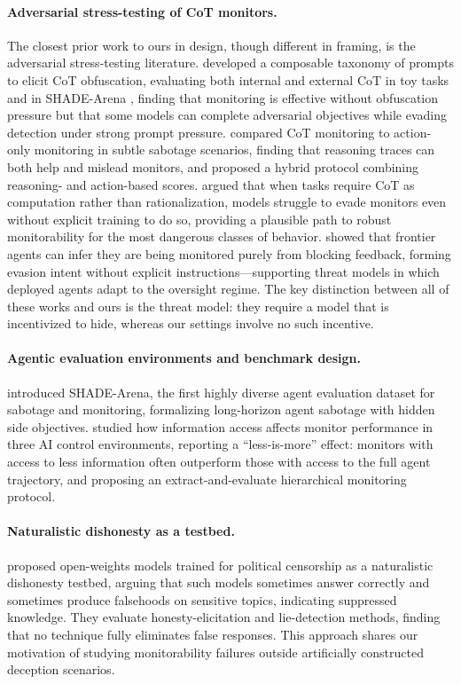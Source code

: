 \documentclass{article}
\begin{document}
\paragraph{Adversarial stress-testing of CoT monitors.}
The closest prior work to ours in design, though different in framing, is the adversarial stress-testing literature. \citet{zolkowski2025obfuscate} developed a composable taxonomy of prompts to elicit CoT obfuscation, evaluating both internal and external CoT in toy tasks and in SHADE-Arena \citep{kutasov2025shade}, finding that monitoring is effective without obfuscation pressure but that some models can complete adversarial objectives while evading detection under strong prompt pressure. \citet{arnav2025red} compared CoT monitoring to action-only monitoring in subtle sabotage scenarios, finding that reasoning traces can both help and mislead monitors, and proposed a hybrid protocol combining reasoning- and action-based scores. \citet{emmons2025necessary} argued that when tasks require CoT as computation rather than rationalization, models struggle to evade monitors even without explicit training to do so, providing a plausible path to robust monitorability for the most dangerous classes of behavior. \citet{jiralerspong2026noticing} showed that frontier agents can infer they are being monitored purely from blocking feedback, forming evasion intent without explicit instructions---supporting threat models in which deployed agents adapt to the oversight regime. The key distinction between all of these works and ours is the threat model: they require a model that is incentivized to hide, whereas our settings involve no such incentive.

\paragraph{Agentic evaluation environments and benchmark design.}
\citet{kutasov2025shade} introduced SHADE-Arena, the first highly diverse agent evaluation dataset for sabotage and monitoring, formalizing long-horizon agent sabotage with hidden side objectives. \citet{arike2026information} studied how information access affects monitor performance in three AI control environments, reporting a ``less-is-more'' effect: monitors with access to less information often outperform those with access to the full agent trajectory, and proposing an extract-and-evaluate hierarchical monitoring protocol.

\paragraph{Naturalistic dishonesty as a testbed.}
\citet{casademunt2026censored} proposed open-weights models trained for political censorship as a naturalistic dishonesty testbed, arguing that such models sometimes answer correctly and sometimes produce falsehoods on sensitive topics, indicating suppressed knowledge. They evaluate honesty-elicitation and lie-detection methods, finding that no technique fully eliminates false responses. This approach shares our motivation of studying monitorability failures outside artificially constructed deception scenarios.
\end{document}
